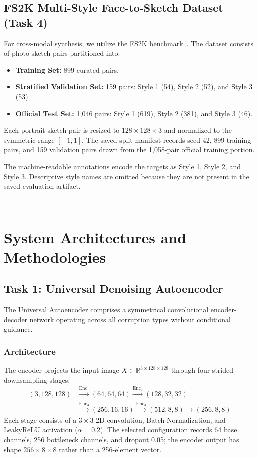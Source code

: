 \documentclass[journal,compsoc]{IEEEtran}
\begin{document}
\subsection{FS2K Multi-Style Face-to-Sketch Dataset (Task 4)}
For cross-modal synthesis, we utilize the FS2K benchmark~\cite{chen2022fs2k}. The dataset consists of photo-sketch pairs partitioned into:
\begin{itemize}
    \item \textbf{Training Set:} 899 curated pairs.
    \item \textbf{Stratified Validation Set:} 159 pairs: Style 1 (54), Style 2 (52), and Style 3 (53).
    \item \textbf{Official Test Set:} 1,046 pairs: Style 1 (619), Style 2 (381), and Style 3 (46).
\end{itemize}
Each portrait-sketch pair is resized to $128 \times 128 \times 3$ and normalized to the symmetric range $[-1, 1]$. The saved split manifest records seed 42, 899 training pairs, and 159 validation pairs drawn from the 1,058-pair official training portion.

The machine-readable annotations encode the targets as Style 1, Style 2, and Style 3. Descriptive style names are omitted because they are not present in the saved evaluation artifact.

---

\section{System Architectures and Methodologies}
\label{sec:methodology}

\subsection{Task 1: Universal Denoising Autoencoder}
The Universal Autoencoder comprises a symmetrical convolutional encoder-decoder network operating across all corruption types without conditional guidance.

\subsubsection{Architecture}
The encoder projects the input image $X \in \mathbb{R}^{3 \times 128 \times 128}$ through four strided downsampling stages:
\begin{equation}
\begin{aligned}
    (3, 128, 128) &\xrightarrow{\text{Enc}_1} (64, 64, 64) \xrightarrow{\text{Enc}_2} (128, 32, 32) \\
    &\xrightarrow{\text{Enc}_3} (256, 16, 16) \xrightarrow{\text{Enc}_4} (512, 8, 8) \to (256,8,8)
\end{aligned}
\end{equation}
Each stage consists of a $3 \times 3$ 2D convolution, Batch Normalization, and LeakyReLU activation ($\alpha = 0.2$). The selected configuration records 64 base channels, 256 bottleneck channels, and dropout 0.05; the encoder output has shape $256\times8\times8$ rather than a 256-element vector.
\end{document}
